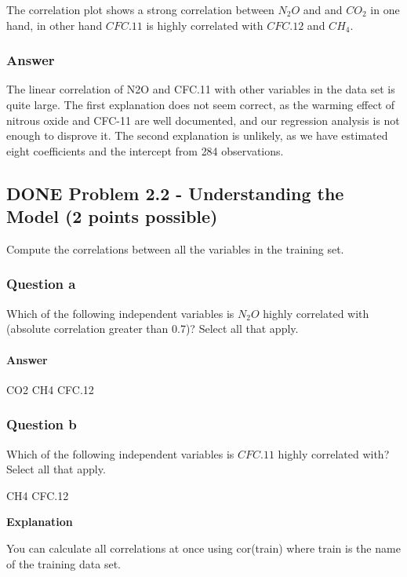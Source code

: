 \documentclass[letterpaper, 9pt, onecolumn, twoside, technote, final]{IEEEtran}
\begin{document}
The correlation plot shows a strong correlation between $N_2 O$ and
and $CO_2$ in one hand, in other hand $CFC.11$ is highly correlated
with $CFC.12$ and $CH_4$.

\subsubsection{Answer}
\label{sec-1-3-1}

The linear correlation of N2O and CFC.11 with other variables in the
data set is quite large. The first explanation does not seem correct,
as the warming effect of nitrous oxide and CFC-11 are well documented,
and our regression analysis is not enough to disprove it. The second
explanation is unlikely, as we have estimated eight coefficients and
the intercept from 284 observations.

\subsection{{\bfseries\sffamily DONE} Problem 2.2 - Understanding the Model (2 points possible)}
\label{sec-1-4}
Compute the correlations between all the variables in the training
set.

\subsubsection{Question a}
\label{sec-1-4-1}

Which of the following independent variables is $N_2O$ highly correlated
with (absolute correlation greater than 0.7)? Select all that apply.

\paragraph{Answer}
\label{sec-1-4-1-1}

CO2
CH4
CFC.12

\subsubsection{Question b}
\label{sec-1-4-2}

Which of the following independent variables is $CFC.11$ highly
correlated with? Select all that apply.

CH4
CFC.12

\textbf{Explanation}

You can calculate all correlations at once using cor(train) where
train is the name of the training data set.
\end{document}

